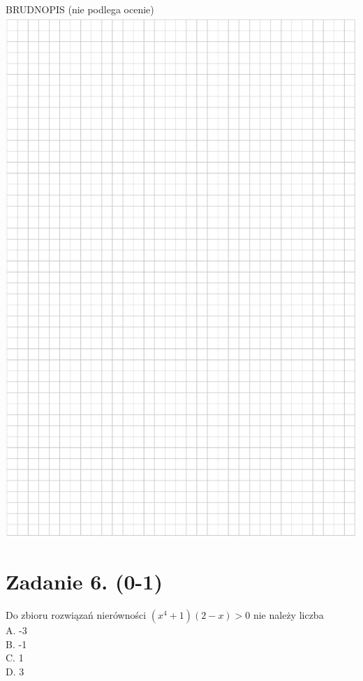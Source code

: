 \documentclass[10pt]{article}
\begin{document}
BRUDNOPIS (nie podlega ocenie)\\
\includegraphics[max width=\textwidth, center]{2024_11_21_7b5527312ea89ae66fd0g-03}

\section*{Zadanie 6. (0-1)}
Do zbioru rozwiązań nierówności \(\left(x^{4}+1\right)(2-x)>0\) nie należy liczba\\
A. -3\\
B. -1\\
C. 1\\
D. 3
\end{document}
